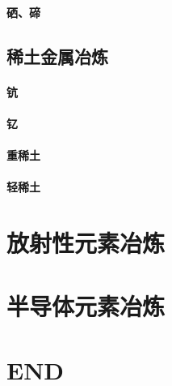 \documentclass[UTF8]{../../ApplicationUniverse}
\begin{document}
    \subsubsection{硒、碲}
\section{稀土金属冶炼}
    \subsubsection{钪}
    \subsubsection{钇}
    \subsubsection{重稀土}
    \subsubsection{轻稀土}





\chapter{放射性元素冶炼}






\chapter{半导体元素冶炼}







\chapter{END}
\end{document}
